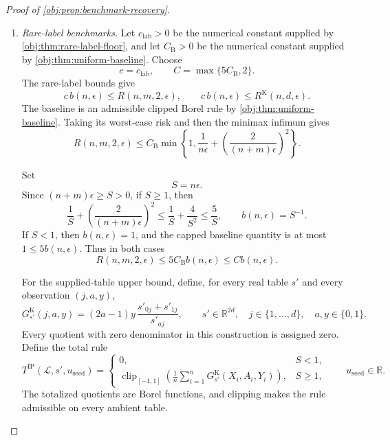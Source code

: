 \begin{proof}[Proof of \cref{obj:prop:benchmark-recovery}]
\begin{enumerate}
\item \emph{Rare-label benchmarks.}
Let \(c_{\mathrm{lab}}>0\) be the numerical constant supplied by
\cref{obj:thm:rare-label-floor}, and let \(C_{\mathrm B}>0\) be the numerical constant supplied by \cref{obj:thm:uniform-baseline}. Choose
\[
c=c_{\mathrm{lab}},
\qquad
C=\max\{5C_{\mathrm B},2\}.
\]
The rare-label bounds give
\[
c\,b(n,\epsilon)\le R(n,m,2,\epsilon),
\qquad
c\,b(n,\epsilon)\le R^{\mathrm K}(n,d,\epsilon).
\]
The baseline is an admissible clipped Borel rule by
\cref{obj:thm:uniform-baseline}. Taking its worst-case risk and then the minimax infimum gives
\[
R(n,m,2,\epsilon)
\le
C_{\mathrm B}\min\left\{
1,\frac1{n\epsilon}
+\left(\frac2{(n+m)\epsilon}\right)^2
\right\}.
\]

Set
\[
S=n\epsilon.
\]
Since \((n+m)\epsilon\ge S>0\), if \(S\ge1\), then
\[
\frac1S+\left(\frac2{(n+m)\epsilon}\right)^2
\le\frac1S+\frac4{S^2}
\le\frac5S,
\qquad
b(n,\epsilon)=S^{-1}.
\]
If \(S<1\), then \(b(n,\epsilon)=1\), and the capped baseline quantity is at most \(1\le5b(n,\epsilon)\). Thus in both cases
\[
R(n,m,2,\epsilon)
\le5C_{\mathrm B}b(n,\epsilon)
\le Cb(n,\epsilon).
\]

For the supplied-table upper bound, define, for every real table \(s'\) and every observation \((j,a,y)\),
\[
G^{\mathrm K}_{s'}(j,a,y)
=(2a-1)y\,\frac{s'_{0j}+s'_{1j}}{s'_{aj}},
\qquad
s'\in\mathbb R^{2d},\quad
j\in\{1,\ldots,d\},\quad a,y\in\{0,1\}.
\]
Every quotient with zero denominator in this construction is assigned zero. Define the total rule
\[
T^{\mathrm{IP}}(\mathcal L,s',u_{\mathrm{seed}})
=
\begin{cases}
0,&S<1,\\[2pt]
\displaystyle
\operatorname{clip}_{[-1,1]}
\left(\frac1n\sum_{i=1}^n
G^{\mathrm K}_{s'}(X_i,A_i,Y_i)\right),&S\ge1,
\end{cases}
\qquad u_{\mathrm{seed}}\in\mathbb R.
\]
The totalized quotients are Borel functions, and clipping makes the rule admissible on every ambient table.


\end{enumerate}
\end{proof}
